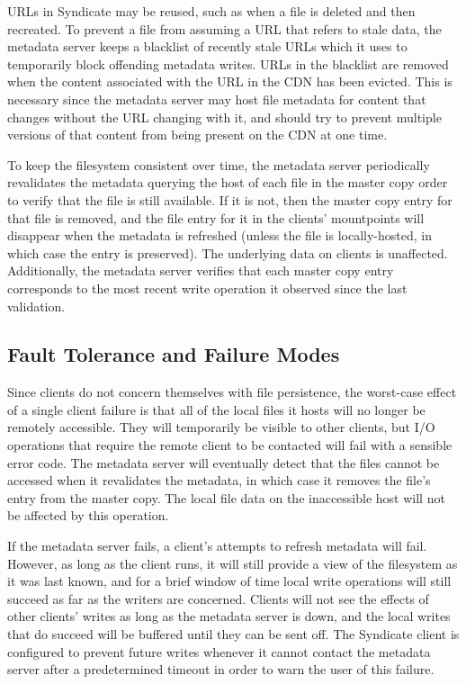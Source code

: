 URLs in Syndicate may be reused, such as when a file is deleted and
then recreated.  To prevent a file from assuming a URL that refers to
stale data, the metadata server keeps a blacklist of recently stale
URLs which it uses to temporarily block offending metadata writes.  URLs in the
blacklist are removed when the content associated with the URL in the
CDN has been evicted.  This is necessary since the metadata server may
host file metadata for content that changes without the URL changing with it, and should try to prevent
multiple versions of that content from being present on the CDN at one
time.

To keep the filesystem consistent over time, the metadata server
periodically revalidates the metadata querying the host of each file in
the master copy order to verify that the file is still available.  If
it is not, then the master copy entry for that file is removed, and the file
entry for it in the clients' mountpoints will disappear when the metadata
is refreshed (unless the file is locally-hosted, in which case the entry
is preserved).  The underlying data on clients is unaffected.
Additionally, the metadata server verifies that each master copy entry
corresponds to the most recent write operation it observed since the
last validation.


\subsection{Fault Tolerance and Failure Modes}

Since clients do not concern themselves with file persistence,
the worst-case effect of a single client failure is that all of the
local files it hosts will no longer be remotely accessible.  They will
temporarily be visible to other clients, but I/O operations that
require the remote client to be contacted will fail with a sensible
error code.  The metadata server will eventually detect that the files
cannot be accessed when it revalidates the metadata, in which case it
removes the file's entry from the master copy.  The local file data
on the inaccessible host will not be affected by this operation.  

If the metadata server fails, a client's attempts to refresh metadata
will fail.  However, as long as the client runs, it will still provide
a view of the filesystem as it was last known, and for a brief window
of time local write operations will still succeed as far as the
writers are concerned.  Clients will not see the effects of
other clients' writes as long as the metadata server is down, and the
local writes that do succeed will be buffered until they can be sent
off.  The Syndicate client is configured to prevent future writes
whenever it cannot contact the metadata server after a predetermined
timeout in order to warn the user of this failure.

